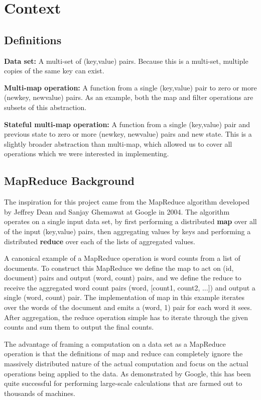 \documentclass{article}
\begin{document}
\section{Context}

\subsection{Definitions}

\textbf{Data set:} A multi-set of (key,value) pairs. Because this is a multi-set, multiple
copies of the same key can exist.

\textbf{Multi-map operation:} A function from a single (key,value) pair to zero or more
(newkey, newvalue) pairs. As an example, both the map and filter operations are subsets
of this abstraction.

\textbf{Stateful multi-map operation:} A function from a single (key,value) pair and previous
state to zero or more (newkey, newvalue) pairs and new state. This is a slightly broader
abstraction than multi-map, which allowed us to cover all operations which we were interested
in implementing.


\subsection{MapReduce Background}

The inspiration for this project came from the MapReduce algorithm developed by
Jeffrey Dean and Sanjay Ghemawat at Google in 2004. The algorithm operates on a
single input data set, by first performing a distributed \textbf{map} over all of
the input (key,value) pairs, then aggregating values by keys and performing a
distributed \textbf{reduce} over each
of the lists of aggregated values.

A canonical example of a MapReduce operation is
word counts from a list of documents. To construct this MapReduce we define the
map to act on (id, document) pairs and output (word, count) pairs, and we define
the reduce to receive the aggregated word count pairs (word, [count1, count2, ...])
and output a single (word, count) pair. The implementation of map in this example
iterates over the words of the document and emits a (word, 1) pair for each word
it sees. After aggregation, the reduce operation simple has to iterate through the
given counts and sum them to output the final counts.

The advantage of framing a computation on a data set as a MapReduce operation
is that the definitions of map and reduce can completely ignore the massively
distributed nature of the actual computation and focus on the actual operations
being applied to the data. As demonstrated by Google, this has been quite
successful for performing large-scale calculations that are farmed out to thousands
of machines.
\end{document}
